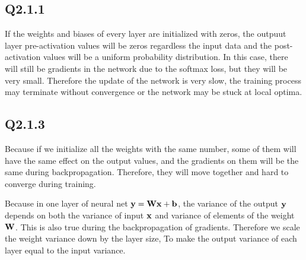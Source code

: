 \documentclass[11pt]{article}
\begin{document}
\newpage

\subsection*{Q2.1.1}

If the weights and biases of every layer are initialized with zeros, the outpuut layer pre-activation values will be zeros regardless the input data and the post-activation values will be a uniform probability distribution.
In this case, there will still be gradients in the network due to the softmax loss, but they will be very small. Therefore the update of the network is very slow, the training process may terminate without convergence or the network may be stuck at local optima.

\newpage

\subsection*{Q2.1.3}

Because if we initialize all the weights with the same number, some of them will have the same effect on the output values, and the gradients on them will be the same during backpropagation. Therefore, they will move together and hard to converge during training.

Because in one layer of neural net $\mathbf{y}=\mathbf{W}\mathbf{x}+\mathbf{b}$, the variance of the output $\mathbf{y}$ depends on both the variance of input $\mathbf{x}$ and variance of elements of the weight $\mathbf{W}$. This is also true during the backpropagation of gradients. Therefore we scale the weight variance down by the layer size, To make the output variance of each layer equal to the input variance.




\end{document}
